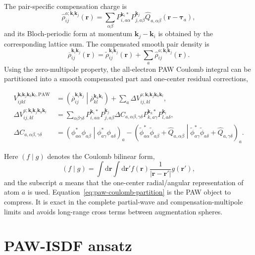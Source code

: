 \documentclass[aps,prb,reprint,superscriptaddress,longbibliography,nofootinbib]{revtex4-2}
\newcommand{\br}{\mathbf r}
\newcommand{\bk}{\mathbf k}
\newcommand{\btau}{\boldsymbol\tau}
\newcommand{\dd}{\mathrm d}
\newcommand{\coul}[2]{\left(#1\middle|#2\right)}
\newcommand{\PAW}{\mathrm{PAW}}
\begin{document}
The pair-specific compensation charge is
\begin{equation}
\widehat\rho_{ij}^{a;\bk_i\bk_j}(\br)
=
\sum_{\alpha\beta}
P_{i,a\alpha}^{\bk_i *}P_{j,a\beta}^{\bk_j}
\widehat Q_{a,\alpha\beta}(\br-\btau_a),
\label{eq:comp-pair}
\end{equation}
and its Bloch-periodic form at momentum \(\bk_j-\bk_i\) is obtained by the corresponding lattice sum.  The compensated smooth pair density is
\begin{equation}
\overline\rho_{ij}^{\bk_i\bk_j}(\br)
=
\widetilde\rho_{ij}^{\bk_i\bk_j}(\br)
+
\sum_a \widehat\rho_{ij}^{a;\bk_i\bk_j}(\br).
\label{eq:comp-smooth-pair}
\end{equation}
Using the zero-multipole property, the all-electron PAW Coulomb integral can be partitioned into a smooth compensated part and one-center residual corrections,
\begin{widetext}
\begin{align}
V_{ijkl}^{\bk_i\bk_j\bk_k\bk_l,\PAW}
&=
\coul{\overline\rho_{ij}^{\bk_i\bk_j}}{\overline\rho_{kl}^{\bk_k\bk_l}}
+
\sum_a
\Delta V_{ij,kl}^{a;\bk_i\bk_j\bk_k\bk_l},
\label{eq:paw-coulomb-partition}\\
\Delta V_{ij,kl}^{a;\bk_i\bk_j\bk_k\bk_l}
&=
\sum_{\alpha\beta\gamma\delta}
P_{i,a\alpha}^{\bk_i *}P_{j,a\beta}^{\bk_j}
\Delta C_{a,\alpha\beta,\gamma\delta}
P_{k,a\gamma}^{\bk_k *}P_{l,a\delta}^{\bk_l},
\label{eq:paw-local-correction}\\
\Delta C_{a,\alpha\beta,\gamma\delta}
&=
\coul{\phi_{a\alpha}^*\phi_{a\beta}}{\phi_{a\gamma}^*\phi_{a\delta}}_{a}
-
\coul{\widetilde\phi_{a\alpha}^*\widetilde\phi_{a\beta}+\widehat Q_{a,\alpha\beta}}
{\widetilde\phi_{a\gamma}^*\widetilde\phi_{a\delta}+\widehat Q_{a,\gamma\delta}}_{a}.
\label{eq:delta-c-def}
\end{align}
\end{widetext}
Here \(\coul{f}{g}\) denotes the Coulomb bilinear form,
\begin{equation}
\coul{f}{g}
=\int\dd\br\int\dd\br' f(\br)\frac{1}{|\br-\br'|}g(\br'),
\label{eq:coulomb-form}
\end{equation}
and the subscript \(a\) means that the one-center radial/angular representation of atom \(a\) is used.  Equation~\eqref{eq:paw-coulomb-partition} is the PAW object to compress.  It is exact in the complete partial-wave and compensation-multipole limits and avoids long-range cross terms between augmentation spheres.

\section{PAW-ISDF ansatz}
\label{sec:pawisdf}
\end{document}
